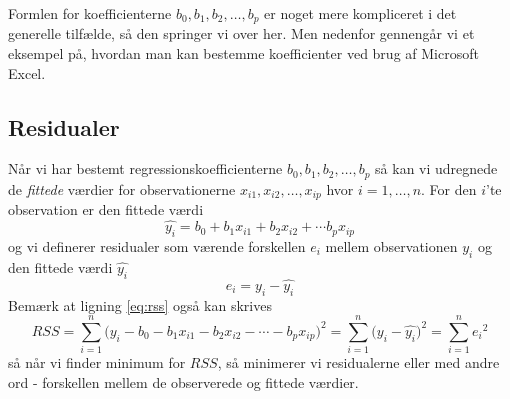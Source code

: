 Formlen for koefficienterne \(b_0,b_1,b_2,\ldots,b_p\) er noget mere kompliceret i det generelle tilfælde, så den springer vi over her. Men nedenfor gennengår vi et eksempel på, hvordan man kan bestemme koefficienter ved brug af Microsoft Excel.

\subsection{Residualer}
Når vi har bestemt regressionskoefficienterne \(b_0,b_1,b_2,\ldots,b_p\) så kan vi udregnede de \textit{fittede} værdier for observationerne \(x_{i1},x_{i2},\ldots,x_{ip}\) hvor \(i=1,\ldots,n\). For den \(i\)'te observation er den fittede værdi
\begin{displaymath}
  \widehat{y_i} = b_0 + b_1 x_{i1} + b_2 x_{i2} + \cdots b_p x_{ip}
\end{displaymath}
og vi definerer residualer som værende forskellen \(e_i\) mellem observationen \(y_i\) og den fittede værdi \(\widehat{y_i}\)
\begin{displaymath}
  e_i = y_i - \widehat{y_i}
\end{displaymath}
Bemærk at ligning \ref{eq:rss} også kan skrives
\begin{displaymath}
  RSS =\sum^n_{i=1} {\big(y_i - b_0 - b_1 x_{i1} - b_2 x_{i2} - \cdots - b_p x_{ip} \big)}^2 = \sum^n_{i=1} {\big(y_i - \widehat{y_i} \big)}^2 =  \sum^n_{i=1} {e_i}^2
\end{displaymath}
så når vi finder minimum for \(RSS\), så minimerer vi residualerne eller med andre ord - forskellen mellem de observerede og fittede værdier.

